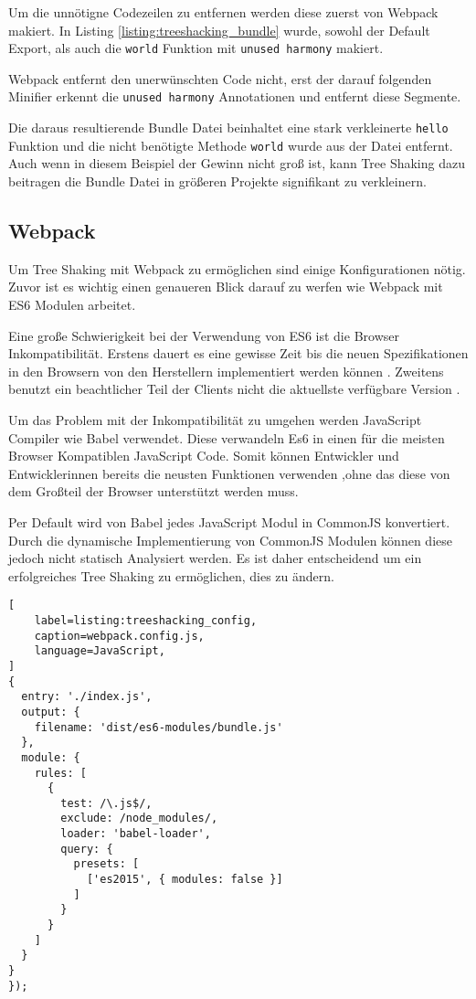 Um die unnötigne Codezeilen zu entfernen werden diese zuerst von Webpack makiert. In Listing \ref{listing:treeshacking_bundle} wurde, sowohl der Default Export, als auch die \lstinline{world} Funktion mit \lstinline{unused harmony} makiert.

Webpack entfernt den unerwünschten Code nicht, erst der darauf folgenden Minifier erkennt die \lstinline{unused harmony} Annotationen und entfernt diese Segmente.

Die daraus resultierende Bundle Datei beinhaltet eine stark verkleinerte \lstinline{hello} Funktion und die nicht benötigte Methode \lstinline{world} wurde aus der Datei entfernt. Auch wenn in diesem Beispiel der Gewinn nicht groß ist, kann Tree Shaking dazu beitragen die Bundle Datei in größeren Projekte signifikant zu verkleinern.
\autocite{WebpackTreeShaking}

\subsection{Webpack}

Um Tree Shaking mit Webpack zu ermöglichen sind einige Konfigurationen nötig. 
Zuvor ist es wichtig einen genaueren Blick darauf zu werfen wie Webpack mit ES6 Modulen arbeitet.

Eine große Schwierigkeit bei der Verwendung von ES6 ist die Browser Inkompatibilität. Erstens dauert es eine gewisse Zeit bis die neuen Spezifikationen in den Browsern von den Herstellern implementiert werden können \autocite{CanIUseES6}. Zweitens benutzt ein beachtlicher Teil der Clients nicht die aktuellste verfügbare Version \autocite{CanIUseUsageTable}.

Um das Problem mit der Inkompatibilität zu umgehen werden JavaScript Compiler wie Babel verwendet. Diese verwandeln Es6 in einen für die meisten Browser Kompatiblen JavaScript Code. Somit können Entwickler und Entwicklerinnen bereits die neusten Funktionen verwenden ,ohne das diese von dem Großteil der Browser unterstützt werden muss.\autocite{Babel}

Per Default wird von Babel jedes JavaScript Modul in CommonJS konvertiert. Durch die dynamische Implementierung von CommonJS Modulen können diese jedoch nicht statisch Analysiert werden. Es ist daher entscheidend um ein erfolgreiches Tree Shaking zu ermöglichen, dies zu ändern.\autocite{Babel}

\begin{lstlisting}[
    label=listing:treeshacking_config,
	caption=webpack.config.js,
	language=JavaScript,
]
{
  entry: './index.js',
  output: {
    filename: 'dist/es6-modules/bundle.js'
  },
  module: {
    rules: [
      {
        test: /\.js$/,
        exclude: /node_modules/,
        loader: 'babel-loader',
        query: {
          presets: [
            ['es2015', { modules: false }]
          ]
        }
      }
    ]
  }
}
});
\end{lstlisting}

